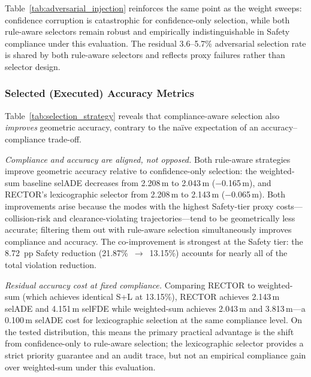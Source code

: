 Table~\ref{tab:adversarial_injection} reinforces the same point as the weight sweeps: confidence corruption is catastrophic for confidence-only selection, while both rule-aware selectors remain robust and empirically indistinguishable in Safety compliance under this evaluation. The residual 3.6--5.7\% adversarial selection rate is shared by both rule-aware selectors and reflects proxy failures rather than selector design.

\subsubsection{Selected (Executed) Accuracy Metrics}
\label{subsubsec:selected_accuracy}

Table~\ref{tab:selection_strategy} reveals that compliance-aware selection also \emph{improves} geometric accuracy, contrary to the na\"ive expectation of an accuracy--compliance trade-off.

\textit{Compliance and accuracy are aligned, not opposed.}  Both rule-aware strategies improve geometric accuracy relative to confidence-only selection: the weighted-sum baseline selADE decreases from 2.208\,m to 2.043\,m ($-$0.165\,m), and RECTOR's lexicographic selector from 2.208\,m to 2.143\,m ($-$0.065\,m).  Both improvements arise because the modes with the highest Safety-tier proxy costs---collision-risk and clearance-violating trajectories---tend to be geometrically less accurate; filtering them out with rule-aware selection simultaneously improves compliance and accuracy.  The co-improvement is strongest at the Safety tier: the 8.72~pp Safety reduction (21.87\%~$\to$~13.15\%) accounts for nearly all of the total violation reduction.

\textit{Residual accuracy cost at fixed compliance.}  Comparing RECTOR to weighted-sum (which achieves identical S+L at 13.15\%), RECTOR achieves 2.143\,m selADE and 4.151\,m selFDE while weighted-sum achieves 2.043\,m and 3.813\,m---a 0.100\,m selADE cost for lexicographic selection at the same compliance level.  On the tested distribution, this means the primary practical advantage is the shift from confidence-only to rule-aware selection; the lexicographic selector provides a strict priority guarantee and an audit trace, but not an empirical compliance gain over weighted-sum under this evaluation.

